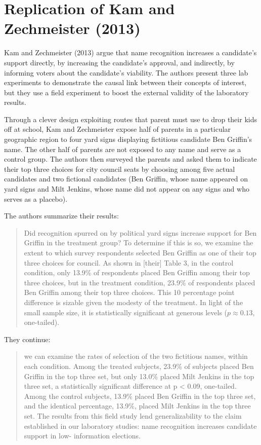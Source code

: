 \documentclass[12pt]{article}
\begin{document}
\section*{Replication of Kam and Zechmeister (2013)}

Kam and Zechmeister (2013) argue that name recognition increases a candidate's support directly, by increasing the candidate's approval, and indirectly, by informing voters about the candidate's viability. The authors present three lab experiments to demonstrate the causal link between their concepts of interest, but they use a field experiment to boost the external validity of the laboratory results. 

Through a clever design exploiting routes that parent must use to drop their kids off at school, Kam and Zechmeister expose half of parents in a particular geographic region to four yard signs displaying fictitious candidate Ben Griffin's name. The other half of parents are not exposed to any name and serve as a control group. The authors then surveyed the parents and asked them to indicate their top three choices for city council seats by choosing among five actual candidates and two fictional candidates (Ben Griffin, whose name appeared on yard signs and Milt Jenkins, whose name did not appear on any signs and who serves as a placebo). 

The authors summarize their results:

\begin{quote}
Did recognition spurred on by political yard signs increase support for Ben Griffin in the treatment group? To determine if this is so, we examine the extent to which survey respondents selected Ben Griffin as one of their top three choices for council. As shown in [their] Table 3, in the control condition, only 13.9\% of respondents placed Ben Griffin among their top three choices, but in the treatment condition, 23.9\% of respondents placed Ben Griffin among their top three choices. This 10 percentage point difference is sizable given the modesty of the treatment. In light of the small sample size, it is statistically significant at generous levels ($p \approx 0.13$, one-tailed).
\end{quote}

They continue:

\begin{quote}
we can examine the rates of selection of the two fictitious names, within each condition. Among the treated subjects, 23.9\% of subjects placed Ben Griffin in the top three set, but only 13.0\% placed Milt Jenkins in the top three set, a statistically significant difference at p < 0.09, one-tailed. Among the control subjects, 13.9\% placed Ben Griffin in the top three set, and the identical percentage, 13.9\%, placed Milt Jenkins in the top three set. The results from this field study lend generalizability to the claim established in our laboratory studies: name recognition increases candidate support in low- information elections.
\end{quote}
\end{document}

